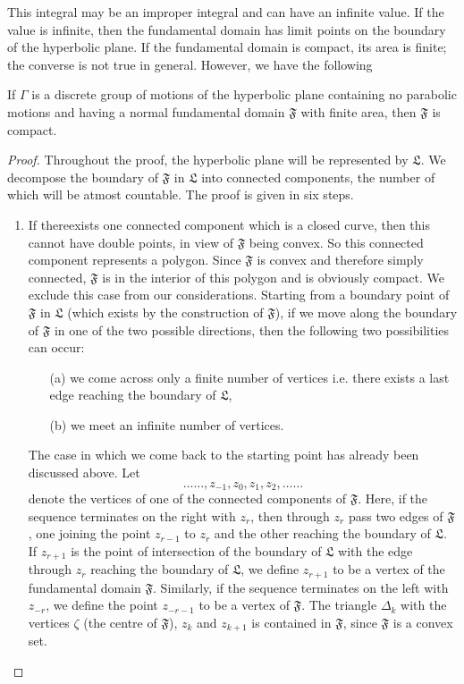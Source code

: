 This integral may be an improper integral and can have an infinite
value. If the value is infinite, then the fundamental domain has limit
points on the boundary of the hyperbolic plane. If the fundamental
domain is compact, its area is finite; the converse is not true in
general. However, we have the following 

\begin{thm}\label{chap1:thm3}
If $\Gamma$ is a discrete group of motions of the hyperbolic plane
containing no parabolic motions and having a normal fundamental domain
$\mathfrak{F}$ with finite area, then $\mathfrak{F}$ is compact.
\end{thm}

\begin{proof}
Throughout the proof, the hyperbolic plane will be represented by
$\mathfrak{L}$. We decompose the boundary of $\mathfrak{F}$ in
$\mathfrak{L}$ into connected components, the number of which will be
atmost countable. The proof is given in six steps.
\begin{enumerate}
\renewcommand{\labelenumi}{\theenumi)}
\item If there\pageoriginale exists one connected component which is a
  closed curve, then this cannot have double points, in view of
  $\mathfrak{F}$ being convex. So this connected component represents
  a polygon. Since $\mathfrak{F}$ is convex and therefore simply
  connected, $\mathfrak{F}$ is in the interior of this polygon and is
  obviously compact. We exclude this case from our
  considerations. Starting from a boundary point of $\mathfrak{F}$ in
  $\mathfrak{L}$ (which exists by the construction of $\mathfrak{F}$),
  if we move along the boundary of $\mathfrak{F}$ in one of the two
  possible directions, then the following two possibilities can occur:
\begin{itemize}
\item[{\rm (a)}] we come across only a finite number of vertices
  i.e. there exists a last edge reaching the boundary of
  $\mathfrak{L}$,

\item[{\rm (b)}] we meet an infinite number of vertices.
\end{itemize}

The case in which we come back to the starting point has already been
discussed above. Let 
$$
\ldots \ldots, z_{-1}, z_0, z_1, z_2, \ldots \ldots
$$
denote the vertices of one of the connected components of
$\mathfrak{F}$. Here, if the sequence terminates on the right with
$z_r$, then through $z_r$ pass two edges of $\mathfrak{F}$, one
joining the point $z_{r-1}$ to $z_r$ and the other reaching the
boundary of $\mathfrak{L}$. If $z_{r+1}$ is the point of intersection
of the boundary of $\mathfrak{L}$ with the edge through $z_r$ reaching
the boundary of $\mathfrak{L}$, we define $z_{r+1}$ to be a vertex of
the fundamental domain $\mathfrak{F}$. Similarly, if the sequence
terminates on the left with $z_{-r}$, we define the point $z_{-r-1}$
to be a vertex of $\mathfrak{F}$. The triangle $\Delta_k$ with the
vertices $\zeta$ (the centre of $\mathfrak{F}$), $z_k$ and $z_{k+1}$
is contained in $\mathfrak{F}$, since $\mathfrak{F}$ is a convex set.


\end{enumerate}
\end{proof}
